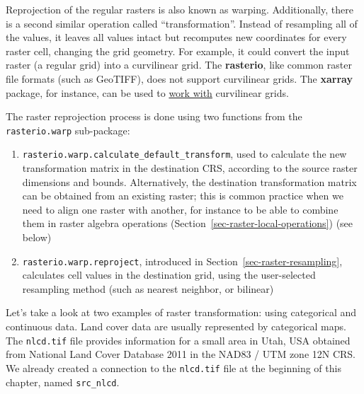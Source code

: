 \documentclass[
  letterpaper,
]{krantz}
\providecommand{\tightlist}{%
  \setlength{\itemsep}{0pt}\setlength{\parskip}{0pt}}\usepackage{longtable,booktabs,array}
\begin{document}
\begin{tcolorbox}[enhanced jigsaw, title=\textcolor{quarto-callout-note-color}{\faInfo}\hspace{0.5em}{Note}, arc=.35mm, toprule=.15mm, titlerule=0mm, colframe=quarto-callout-note-color-frame, breakable, toptitle=1mm, bottomtitle=1mm, rightrule=.15mm, colbacktitle=quarto-callout-note-color!10!white, leftrule=.75mm, left=2mm, bottomrule=.15mm, opacityback=0, coltitle=black, opacitybacktitle=0.6, colback=white]

Reprojection of the regular rasters is also known as warping.
Additionally, there is a second similar operation called
``transformation''. Instead of resampling all of the values, it leaves
all values intact but recomputes new coordinates for every raster cell,
changing the grid geometry. For example, it could convert the input
raster (a regular grid) into a curvilinear grid. The \textbf{rasterio},
like common raster file formats (such as GeoTIFF), does not support
curvilinear grids. The \textbf{xarray} package, for instance, can be
used to
\href{https://docs.xarray.dev/en/stable/examples/multidimensional-coords.html}{work
with} curvilinear grids.

\end{tcolorbox}

The raster reprojection process is done using two functions from the
\texttt{rasterio.warp} sub-package:

\begin{enumerate}
\def\labelenumi{\arabic{enumi}.}
\tightlist
\item
  \texttt{rasterio.warp.calculate\_default\_transform}, used to
  calculate the new transformation matrix in the destination CRS,
  according to the source raster dimensions and bounds. Alternatively,
  the destination transformation matrix can be obtained from an existing
  raster; this is common practice when we need to align one raster with
  another, for instance to be able to combine them in raster algebra
  operations (Section~\ref{sec-raster-local-operations}) (see below)
\item
  \texttt{rasterio.warp.reproject}, introduced in
  Section~\ref{sec-raster-resampling}, calculates cell values in the
  destination grid, using the user-selected resampling method (such as
  nearest neighbor, or bilinear)
\end{enumerate}

Let's take a look at two examples of raster transformation: using
categorical and continuous data. Land cover data are usually represented
by categorical maps. The \texttt{nlcd.tif} file provides information for
a small area in Utah, USA obtained from National Land Cover Database
2011 in the NAD83 / UTM zone 12N CRS. We already created a connection to
the \texttt{nlcd.tif} file at the beginning of this chapter, named
\texttt{src\_nlcd}.
\end{document}
